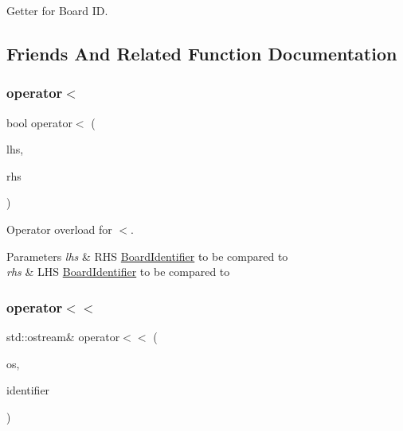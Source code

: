 Getter for Board ID. 



\subsection{Friends And Related Function Documentation}
\mbox{\label{class_board_identifier_a952ba26774a854af0abe8f188ddda22b}} 
\subsubsection{\texorpdfstring{operator$<$}{operator<}}
{\footnotesize\ttfamily bool operator$<$ (\begin{DoxyParamCaption}\item[{const \hyperlink{class_board_identifier}{Board\+Identifier} \&}]{lhs,  }\item[{const \hyperlink{class_board_identifier}{Board\+Identifier} \&}]{rhs }\end{DoxyParamCaption})\hspace{0.3cm}{\ttfamily [friend]}}



Operator overload for $<$. 


\begin{DoxyParams}{Parameters}
{\em lhs} & R\+HS \hyperlink{class_board_identifier}{Board\+Identifier} to be compared to \\
\hline
{\em rhs} & L\+HS \hyperlink{class_board_identifier}{Board\+Identifier} to be compared to \\
\hline
\end{DoxyParams}
\mbox{\label{class_board_identifier_a7c82c259188e9ed8c552911db5c4f454}} 
\subsubsection{\texorpdfstring{operator$<$$<$}{operator<<}}
{\footnotesize\ttfamily std\+::ostream\& operator$<$$<$ (\begin{DoxyParamCaption}\item[{std\+::ostream \&}]{os,  }\item[{const \hyperlink{class_board_identifier}{Board\+Identifier} \&}]{identifier }\end{DoxyParamCaption})\hspace{0.3cm}{\ttfamily [friend]}}



